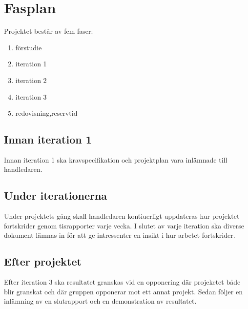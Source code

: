 \section{Fasplan}
Projektet består av fem faser:
\begin{enumerate}
\item förstudie
\item iteration 1
\item iteration 2
\item iteration 3
\item redovisning,reservtid
\end{enumerate}

\subsection{Innan iteration 1}
Innan iteration 1 ska kravspecifikation och projektplan vara inlämnade till handledaren. 

\subsection{Under iterationerna}
Under projektets gång skall handledaren kontiuerligt uppdateras hur projektet fortskrider genom tisrapporter varje vecka. I slutet av varje iteration ska diverse dokument lämnas in för att ge intressenter en insikt i hur arbetet fortskrider. 

\subsection{Efter projektet}
Efter iteration 3 ska resultatet granskas vid en opponering där projeketet både blir granskat och där gruppen opponerar mot ett annat projekt. Sedan följer en inlämning av en slutrapport och en demonstration av resultatet. 